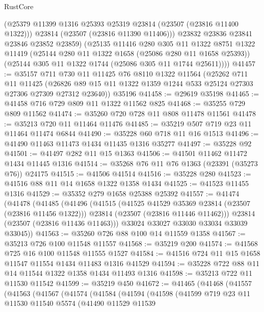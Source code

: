 \begin{lexlean}{RustCore}
\begin{coremodule}
          (@25379 @11399 @1316 @25393 @25319 @23814 (@23507 (@23816 @11400 @1322)))
          @23814
          (@23507 (@23816 @11390 @11406)))
        @23832
        @23836
        @23841
        @23846
        @23852
        @23859)
      (@25135
        @11416
        @280
        @305
        @11
        @1322
        @8751
        @1322
        @11419
        (@25144 @280 @11 @1322 @1658 (@25086 @280 @11 @1658 @25393))
        (@25144 @305 @11 @1322 @1744 (@25086 @305 @11 @1744 @25611))))
@41457 := @35157
    @711
    @730
    @11
    @11425
    @76
    @8110
    @1322
    @11564
    (@25262
      @711
      @11
      @11425
      (@26826 @89 @15 @11 @1322 @1359 @1244 @533 @25124 @27303 @27306 @27309 @27312 @23640))
    @35196
@41458 := @29619 @35198
@41465 := @41458 @716 @729 @809 @11 @1322 @11562 @825
@41468 := @35255 @729 @809 @11562
@41474 := @35260 @720 @728 @11 @808 @11478 @11561
@41478 := @35213 @720 @11 @11464 @11476
@41485 := @35219 @507 @719 @23 @11 @11464 @11474 @6844
@41490 := @35228 @60 @718 @11 @16 @1513
@41496 := @41490 @11463 @11473 @1434 @11435 @1316 @35277
@41497 := @35228 @92
@41501 := @41497 @282 @11 @15 @1363
@41506 := @41501 @11462 @11472 @1434 @11445 @1316
@41514 := @35268 @76 @11 @76 @1363 (@23391 (@35273 @76)) @24175
@41515 := @41506 @41514
@41516 := @35228 @280
@41523 := @41516 @88 @11 @14 @1658 @1322 @1358 @1434
@41525 := @41523 @11455 @1316
@41529 := @35352 @279 @1658 @25388 @25392
@41557 := @41474
    (@41478
      (@41485
        (@41496
          (@41515
            (@41525 @41529 @35369 @23814 (@23507 (@23816 @11456 @1322)))
            @23814
            (@23507 (@23816 @11446 @11462)))
          @23814
          (@23507 (@23816 @11436 @11463)))
        @33024
        @33027
        @33030
        @33034
        @33039
        @33045))
@41563 := @35260 @726 @88 @100 @14 @11559 @1358
@41567 := @35213 @726 @100 @11548 @11557
@41568 := @35219 @200
@41574 := @41568 @725 @16 @100 @11548 @11555 @1527
@41584 := @41516 @724 @11 @15 @1658 @11547 @11554 @1434 @11483 @1316 @41529
@41594 := @35228 @722 @88 @11 @14 @11544 @1322 @1358 @1434 @11493 @1316
@41598 := @35213 @722 @11 @11530 @11542
@41599 := @35219 @450
@41672 := @41465
    (@41468
      (@41557
        (@41563
          (@41567
            (@41574
              (@41584
                (@41594
                  (@41598
                    (@41599
                      @719
                      @23
                      @11
                      @11530
                      @11540
                      @5574
                      (@41490
                        @11529
                        @11539

\end{coremodule}
\end{lexlean}
